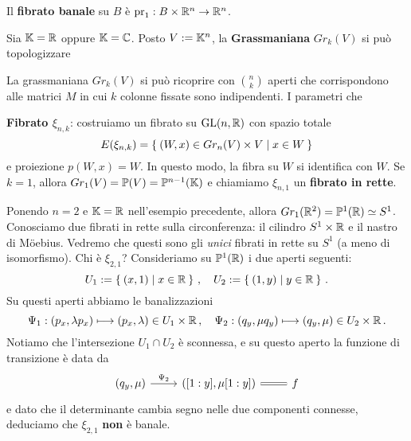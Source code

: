 \begin{ex}
	\begin{rmnumerate}
		\item Il \textbf{fibrato banale} su $B$ è $\mathrm{pr}_{1}:B \times {\mathbb R}^{n} \to {\mathbb R}^{n}$.
		
		\item Sia $\mathbb{K} = {\mathbb R}$ oppure $\mathbb{K} = \mathbb{C}$.
		Posto $V := \mathbb{K}^{n}$, la \textbf{Grassmaniana} $Gr_{k}(V)$ si può topologizzare
		
		
		La grassmaniana $Gr_{k}(V)$ si può ricoprire con $\binom{n}{k}$ aperti
		che corrispondono alle matrici $M$ in cui $k$ colonne fissate sono indipendenti.
		I parametri che 
		
		\textbf{Fibrato $\xi_{n,k}$}: costruiamo un fibrato su $\mathrm{GL}(n,{\mathbb R})$
		con spazio totale
		\begin{equation*}
			E(\xi_{n,k}) = \Set{(W,x) \in Gr_{n}(V) \times V | x \in W}
		\end{equation*}
		e proiezione $p(W,x)=W$. In questo modo,
		la fibra su $W$ si identifica con $W$.
		Se $k=1$, allora $Gr_{1}(V) = \mathbb{P}(V) = \mathbb{P}^{n-1}(\mathbb{K})$ e chiamiamo
		$\xi_{n,1}$ un \textbf{fibrato in rette}.
		
		\item Ponendo $n=2$ e $\mathbb{K} = {\mathbb R}$ nell'esempio precedente,
		allora $Gr_{1}({\mathbb R}^{2}) = \mathbb{P}^{1}({\mathbb R}) \simeq S^{1}$.
		Conosciamo due fibrati in rette sulla circonferenza:
		il cilindro $S^{1} \times {\mathbb R}$ e il nastro di Möebius.
		Vedremo che questi sono gli \emph{unici} fibrati in rette su $S^{1}$
		(a meno di isomorfismo). Chi è $\xi_{2,1}$?
		Consideriamo su $\mathbb{P}^{1}({\mathbb R})$ i due aperti seguenti:
		\begin{equation*}
			U_{1} := \Set{(x,1) | x \in {\mathbb R}}\,, \quad
			U_{2} := \Set{(1,y) | y \in {\mathbb R}}\,.
		\end{equation*}
		Su questi aperti abbiamo le banalizzazioni
		\begin{equation*}
			\Psi_{1} : (p_{x}, \lambda p_{x} ) \longmapsto (p_{x}, \lambda) \in U_{1} \times {\mathbb R}\,,
			\quad \Psi_{2} : (q_{y}, \mu q_{y}) \longmapsto (q_{y},\mu) \in U_{2} \times {\mathbb R}\,.
		\end{equation*}
		Notiamo che l'intersezione $U_{1} \cap U_{2}$ è sconnessa,
		e su questo aperto la funzione di transizione è data da
		\begin{equation*}
			\begin{tikzcd}
				(q_{y},\mu) \ar[r, "\Psi_{2}"]
				& {\left([1:y], \mu [1:y] \right)} \ar[r,equals]
				& f
			\end{tikzcd}
		\end{equation*}
		e dato che il determinante cambia segno nelle due componenti
		connesse, deduciamo che $\xi_{2,1}$ \textbf{non} è banale.
	\end{rmnumerate}
\end{ex}

